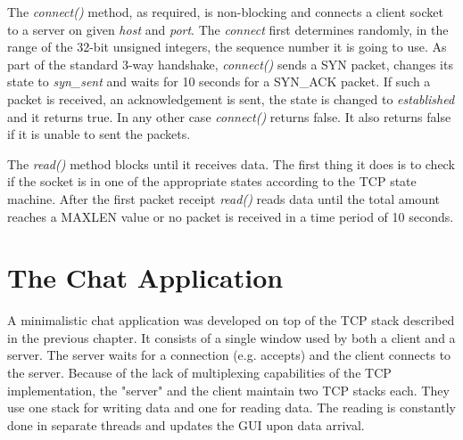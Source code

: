 \documentclass{article}
\begin{document}
The \textit{connect()} method, as required, is non-blocking and connects a client socket to a server on given \textit{host}
and \textit{port}. The \textit{connect} first determines randomly, in the range of the 32-bit unsigned integers,
the sequence number it is going to use. As part of the standard 3-way handshake, \textit{connect()} sends a SYN packet,
changes its state to \textit{syn\_sent} and waits for 10 seconds for a SYN\_ACK packet. If such a packet is received, an acknowledgement
is sent, the state is changed to \textit{established} and it returns true. In any other case \textit{connect()} returns false. It also
returns false if it is unable to sent the packets.

The \textit{read()} method blocks until it receives data. The first thing it does is to check if the socket is in one of the appropriate states
according to the TCP state machine. After the first packet receipt \textit{read()} reads data until the total amount
reaches a MAXLEN value or no packet is received in a time period of 10 seconds. 



\section{The Chat Application}
A minimalistic chat application was developed on top of the TCP stack described in the previous chapter.
It consists of a single window used by both a client and a server. The server waits for a connection
(e.g. accepts) and the client connects to the server. Because of the lack of multiplexing capabilities
of the TCP implementation, the "server" and the client maintain two TCP stacks each. They use one stack
for writing data and one for reading data. The reading is constantly done in separate threads and updates
the GUI upon data arrival.
\end{document}
